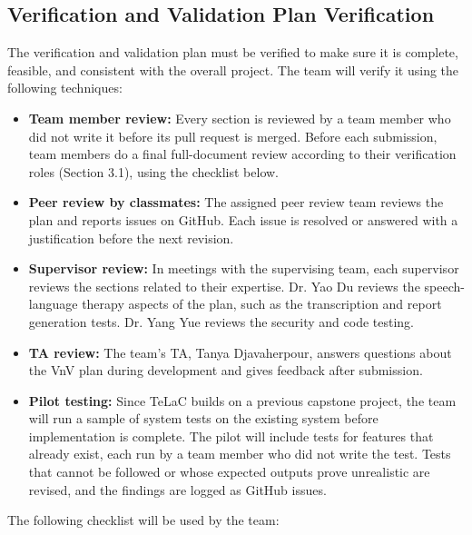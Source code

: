 \documentclass[12pt, titlepage]{article}
\renewcommand{\_}{\oldunderscore\allowbreak}
\begin{document}
\subsection{Verification and Validation Plan Verification}

The verification and validation plan must be verified to make sure it is complete, feasible, and consistent with the overall project. The team will verify it using the following techniques:
\begin{itemize}
  \item \textbf{Team member review:} Every section is reviewed by a team member who did not write it before its pull request is merged. Before each submission, team members do a final full-document review according to their verification roles (Section 3.1), using the checklist below.
  \item \textbf{Peer review by classmates:} The assigned peer review team reviews the plan and reports issues on GitHub. Each issue is resolved or answered with a justification before the next revision.
  \item \textbf{Supervisor review:} In meetings with the supervising team, each supervisor reviews the sections related to their expertise. Dr. Yao Du reviews the speech-language therapy aspects of the plan, such as the transcription and report generation tests. Dr. Yang Yue reviews the security and code testing.
  \item \textbf{TA review:} The team's TA, Tanya Djavaherpour, answers questions about the VnV plan during development and gives feedback after submission.
  \item \textbf{Pilot testing:} Since TeLaC builds on a previous capstone project, the team will run a sample of system tests on the existing system before implementation is complete. The pilot will include tests for features that already exist, each run by a team member who did not write the test. Tests that cannot be followed or whose expected outputs prove unrealistic are revised, and the findings are logged as GitHub issues.
\end{itemize}

The following checklist will be used by the team:
\end{document}
